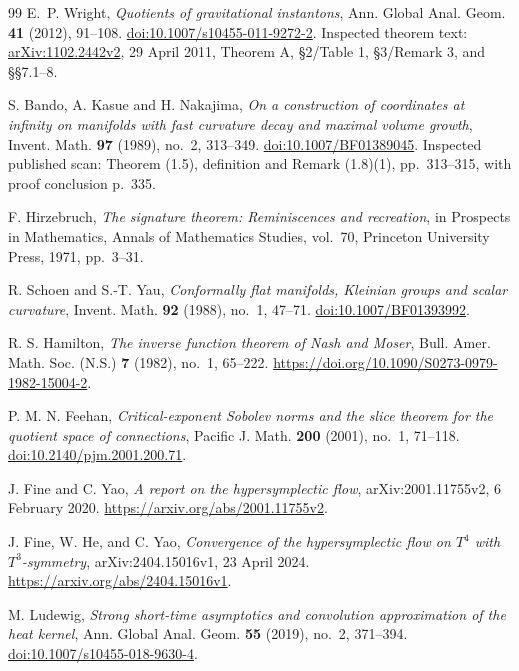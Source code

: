 \documentclass[11pt]{article}
\numberwithin{equation}{section}
\theoremstyle{definition}
\theoremstyle{remark}
\begin{document}
\begin{thebibliography}{99}
E.~P. Wright,
\emph{Quotients of gravitational instantons},
Ann. Global Anal. Geom. \textbf{41} (2012), 91--108.
\href{https://doi.org/10.1007/s10455-011-9272-2}{doi:10.1007/s10455-011-9272-2}.
Inspected theorem text: \href{https://arxiv.org/abs/1102.2442v2}{arXiv:1102.2442v2},
29 April 2011, Theorem A, \S2/Table 1, \S3/Remark 3, and \S\S7.1--8.

S. Bando, A. Kasue and H. Nakajima,
\emph{On a construction of coordinates at infinity on manifolds with
fast curvature decay and maximal volume growth},
Invent. Math. \textbf{97} (1989), no.~2, 313--349.
\href{https://doi.org/10.1007/BF01389045}{doi:10.1007/BF01389045}.
Inspected published scan: Theorem (1.5), definition and Remark (1.8)(1),
pp.~313--315, with proof conclusion p.~335.

F. Hirzebruch,
\emph{The signature theorem: Reminiscences and recreation},
in Prospects in Mathematics, Annals of Mathematics Studies, vol.~70,
Princeton University Press, 1971, pp.~3--31.

R. Schoen and S.-T. Yau,
\emph{Conformally flat manifolds, Kleinian groups and scalar curvature},
Invent. Math. \textbf{92} (1988), no.~1, 47--71.
\href{https://doi.org/10.1007/BF01393992}{doi:10.1007/BF01393992}.

R. S. Hamilton,
\emph{The inverse function theorem of Nash and Moser},
Bull. Amer. Math. Soc. (N.S.) \textbf{7} (1982), no.~1, 65--222.
\url{https://doi.org/10.1090/S0273-0979-1982-15004-2}.

P. M. N. Feehan,
\emph{Critical-exponent Sobolev norms and the slice theorem for the quotient space of connections},
Pacific J. Math. \textbf{200} (2001), no.~1, 71--118.
\href{https://doi.org/10.2140/pjm.2001.200.71}{doi:10.2140/pjm.2001.200.71}.

J. Fine and C. Yao,
\emph{A report on the hypersymplectic flow},
arXiv:2001.11755v2, 6 February 2020.
\url{https://arxiv.org/abs/2001.11755v2}.

J. Fine, W. He, and C. Yao,
\emph{Convergence of the hypersymplectic flow on $T^4$ with $T^3$-symmetry},
arXiv:2404.15016v1, 23 April 2024.
\url{https://arxiv.org/abs/2404.15016v1}.

M. Ludewig,
\emph{Strong short-time asymptotics and convolution approximation of the heat kernel},
Ann. Global Anal. Geom. \textbf{55} (2019), no.~2, 371--394.
\href{https://doi.org/10.1007/s10455-018-9630-4}{doi:10.1007/s10455-018-9630-4}.


\end{thebibliography}
\end{document}
